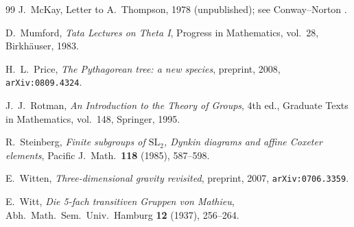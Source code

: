 \documentclass[12pt]{amsart}
\theoremstyle{definition}
\theoremstyle{remark}
\newcommand{\SL}{\mathrm{SL}}
\begin{document}
\begin{thebibliography}{99}
J.~McKay,
Letter to A.~Thompson, 1978 (unpublished); see Conway--Norton
\cite{conway-norton}.

D.~Mumford,
\emph{Tata Lectures on Theta I},
Progress in Mathematics, vol.~28, Birkh\"auser, 1983.

H.~L.~Price,
\emph{The Pythagorean tree: a new species},
preprint, 2008, \texttt{arXiv:0809.4324}.

J.~J.~Rotman,
\emph{An Introduction to the Theory of Groups},
4th ed., Graduate Texts in Mathematics, vol.~148, Springer, 1995.

R.~Steinberg,
\emph{Finite subgroups of $\SL_2$, Dynkin diagrams and affine Coxeter
elements},
Pacific J.\ Math.\ \textbf{118} (1985), 587--598.

E.~Witten,
\emph{Three-dimensional gravity revisited},
preprint, 2007, \texttt{arXiv:0706.3359}.

E.~Witt,
\emph{Die 5-fach transitiven Gruppen von Mathieu},
Abh.\ Math.\ Sem.\ Univ.\ Hamburg \textbf{12} (1937), 256--264.

\end{thebibliography}
\end{document}

